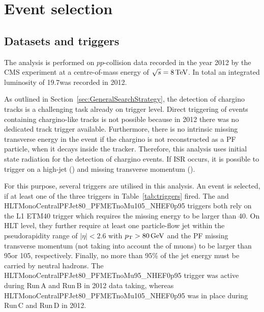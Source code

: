 
\FloatBarrier
\chapter{Event selection}
\label{sec:EventSelection}
\section{Datasets and triggers}
\label{sec:DatasetsAndTriggers}

The analysis is performed on $pp$-collision data recorded in the year 2012 by the CMS experiment at a centre-of-mass energy of $\sqrt{s}=8\,\text{Te}\kern-0.06667em\text{V}$.
In total an integrated luminosity of 19.7\fbinv was recorded in 2012.

As outlined in Section~\ref{sec:GeneralSearchStrategy}, the detection of chargino tracks is a challenging task already on trigger level.
Direct triggering of events containing chargino-like tracks is not possible because in 2012 there was no dedicated track trigger available.
Furthermore, there is no intrinsic missing transverse energy in the event if the chargino is not reconstructed as a PF particle, \eg when it decays inside the tracker.
Therefore, this analysis uses initial state radiation for the detection of chargino events.
If ISR occurs, it is possible to trigger on a high-\pt jet (\ptfirstjet) and missing transverse momentum (\met).

For this purpose, several triggers are utilised in this analysis.
An event is selected, if at least one of the three triggers in Table~\ref{tab:triggers} fired.
The  and HLTMonoCentralPFJet80\_PFMETnoMu105\_NHEF0p95 triggers both rely on the L1 ETM40 trigger which requires the missing energy to be larger than 40\gev.
On HLT level, they further require at least one particle-flow jet within the pseudorapidity range of $|\eta|<2.6$ with $p_{\text{T}}>80\,\text{Ge}\kern-0.06667em\text{V}$ and the PF missing transverse momentum (not taking into account the \pt of muons) to be larger than 95\gev or 105\gev, respectively.
Finally, no more than 95\% of the jet energy must be carried by neutral hadrons.
The HLTMonoCentralPFJet80\_PFMETnoMu95\_NHEF0p95 trigger was active during Run\,A and Run\,B in 2012 data taking, whereas HLTMonoCentralPFJet80\_PFMETnoMu105\_NHEF0p95 was in place during Run\,C and Run\,D in 2012.

